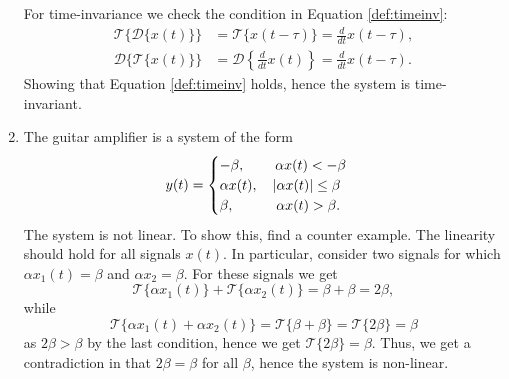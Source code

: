 \begin{enumerate}
For time-invariance we check the condition in Equation \ref{def:timeinv}:
\begin{align*}
    \mathcal{T}\{\mathcal{D}\{x(t)\}\}&=\mathcal{T}\{x(t-\tau)\}=\frac{d}{dt}x(t-\tau), \\
    \mathcal{D}\{\mathcal{T}\{x(t)\}\}&=\mathcal{D}\left\{\frac{d}{dt}x(t)\right\}=\frac{d}{dt}x(t-\tau).
\end{align*}
Showing that Equation \ref{def:timeinv} holds, hence the system is time-invariant. 

\item The guitar amplifier is a system of the form
$$y(t)=\begin{cases}
    -\beta, \quad \hspace{0.4cm} \alpha x(t)<-\beta  \\
    \alpha x(t), \quad |\alpha x(t)|\le \beta \\
    \beta, \quad \hspace{0.7cm}\alpha x(t)>\beta.
\end{cases}$$
The system is not linear. To show this, find a counter example. The linearity should hold for all signals $x(t)$. In particular, consider two signals for which $\alpha x_{1}(t)=\beta$ and $\alpha x_{2}=\beta$. For these signals we get
$$\mathcal{T}\{\alpha x_{1}(t)\}+\mathcal{T}\{\alpha x_{2}(t)\}=\beta+\beta=2\beta,$$
while
$$\mathcal{T}\{\alpha x_{1}(t)+\alpha x_{2}(t)\}=\mathcal{T}\{\beta+\beta\}=\mathcal{T}\{2\beta\}=\beta$$
as $2\beta > \beta$ by the last condition, hence we get $\mathcal{T}\{2\beta\}=\beta$. Thus, we get a contradiction in that $2\beta=\beta$ for all $\beta$, hence the system is non-linear. 


\end{enumerate}
